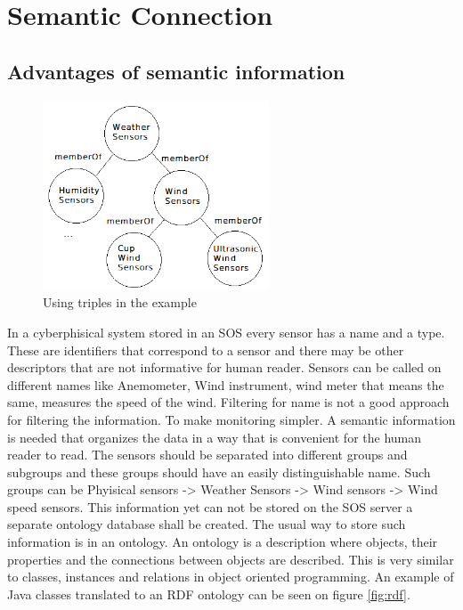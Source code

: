 \chapter{Semantic Connection}

\section{Advantages of semantic information}

\begin{figure}[h]
\centering
\includegraphics[width=0.6\textwidth]{figures/semws.png}
\caption{Using triples in the example\label{fig:semws}}
\end{figure}

In a cyberphisical system stored in an SOS every sensor has a name and a type. These are identifiers that correspond to a sensor and there may be other descriptors that are not informative for human reader. Sensors can be called on different names like Anemometer, Wind instrument, wind meter that means the same, measures the speed of the wind. Filtering for name is not a good approach for filtering the information. To make monitoring simpler. A semantic information is needed that organizes the data in a way that is convenient for the human reader to read. The sensors should be separated into different groups and subgroups and these groups should have an easily distinguishable name. Such groups can be Phyisical sensors -> Weather Sensors -> Wind sensors -> Wind speed sensors. This information yet can not be stored on the SOS server a separate ontology database shall be created. 
The usual way to store such information is in an ontology. 
An ontology is a description where objects, their properties and the connections between objects are described. This is very similar to classes, instances and relations in object oriented programming. An example of Java classes translated to an RDF ontology can be seen on figure \ref{fig:rdf}\cite{g2d4}.



